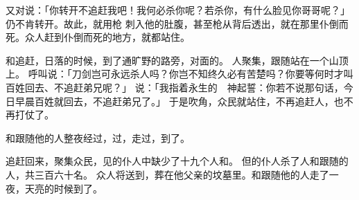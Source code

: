 {又对{}说：「你转开不追赶我吧！我何必杀你呢？若杀你，有什么脸见你哥哥{}呢？」
仍不肯转开。故此，{}就用枪 刺入他的肚腹，甚至枪从背后透出，{}就在那里仆倒而死。众人赶到{}仆倒而死的地方，就都站住。
\par }{\PP {}和{}追赶{}，日落的时候，到了通{}旷野的路旁，{}对面的{}。
人聚集，跟随{}站在一个山顶上。
呼叫{}说：「刀剑岂可永远杀人吗？你岂不知终久必有苦楚吗？你要等何时才叫百姓回去、不追赶弟兄呢？」
说：「我指着永生的　神起誓：你若不说{}那句话，今日早晨百姓就回去，不追赶弟兄了。」
于是{}吹角，众民就站住，不再追赶{}人，也不再打仗了。
\par }{\PP {}和跟随他的人整夜经过{}，过{}，走过{}，到了{}。
\par }{\PP {}追赶{}回来，聚集众民，见{}的仆人中缺少了十九个人和{}。
但{}的仆人杀了{}人和跟随{}的人，共三百六十名。
众人将{}送到{}，葬在他父亲的坟墓里。{}和跟随他的人走了一夜，天亮的时候到了{}。

}
